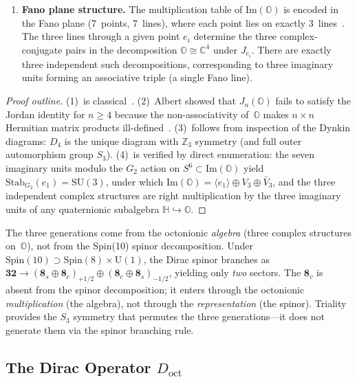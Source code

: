 \begin{theorem}[Algebraic Rigidity of $N_g = 3$]
\begin{enumerate}
  \item \textbf{Fano plane structure.} The multiplication table of $\mathrm{Im}(\mathbb{O})$ is encoded in the Fano plane (7~points, 7~lines), where each point lies on exactly 3~lines~\cite{ch4:Baez2002}. The three lines through a given point $e_i$ determine the three complex-conjugate pairs in the decomposition $\mathbb{O} \cong \mathbb{C}^4$ under $J_{e_i}$. There are exactly three independent such decompositions, corresponding to three imaginary units forming an associative triple (a single Fano line).
\end{enumerate}
\end{theorem}

\begin{proof}[Proof outline]
(1)~is classical~\cite{ch4:Hurwitz1898}. (2)~Albert showed that $J_n(\mathbb{O})$ fails to satisfy the Jordan identity for $n \geq 4$ because the non-associativity of~$\mathbb{O}$ makes $n \times n$ Hermitian matrix products ill-defined~\cite{ch4:Albert1934}. (3)~follows from inspection of the Dynkin diagrams: $D_4$ is the unique diagram with $\mathbb{Z}_3$ symmetry (and full outer automorphism group $S_3$). (4)~is verified by direct enumeration: the seven imaginary units modulo the $G_2$ action on $S^6 \subset \mathrm{Im}(\mathbb{O})$ yield $\mathrm{Stab}_{G_2}(e_1) = \mathrm{SU}(3)$, under which $\mathrm{Im}(\mathbb{O}) = \langle e_1 \rangle \oplus V_3 \oplus \bar{V}_3$, and the three independent complex structures are right multiplication by the three imaginary units of any quaternionic subalgebra $\mathbb{H} \hookrightarrow \mathbb{O}$.
\end{proof}

\begin{remark}
The three generations come from the octonionic \emph{algebra} (three complex structures on~$\mathbb{O}$), not from the Spin(10) spinor decomposition. Under $\mathrm{Spin}(10) \supset \mathrm{Spin}(8) \times \mathrm{U}(1)$, the Dirac spinor branches as $\mathbf{32} \to (\mathbf{8}_s \oplus \mathbf{8}_c)_{+1/2} \oplus (\mathbf{8}_c \oplus \mathbf{8}_s)_{-1/2}$, yielding only \emph{two} sectors. The $\mathbf{8}_v$ is absent from the spinor decomposition; it enters through the octonionic \emph{multiplication} (the algebra), not through the \emph{representation} (the spinor). Triality provides the $S_3$ symmetry that permutes the three generations---it does not generate them via the spinor branching rule.
\end{remark}


\subsection{The Dirac Operator \texorpdfstring{$D_{\mathrm{oct}}$}{D\_oct}}
\label{sec:4-doct}

